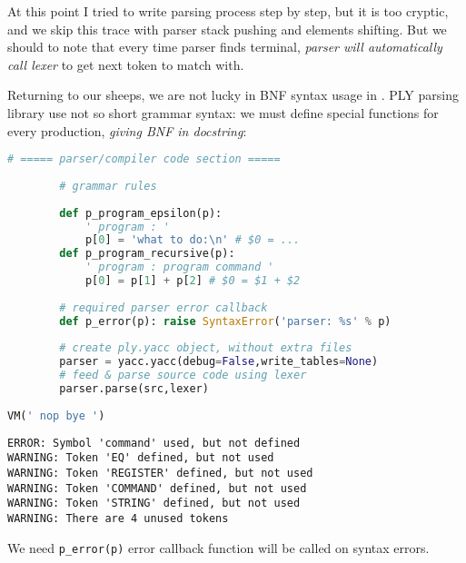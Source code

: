 \bigskip
At this point I tried to write parsing process step by step, but it is too
cryptic, and we skip this trace with parser stack pushing and elements shifting.
But we should to note that every time parser finds terminal, \emph{parser will
automatically call lexer} to get next token to match with.

\clearpage
Returning to our sheeps, we are not lucky in BNF syntax usage in \py.
PLY parsing library use not so short grammar syntax: we must define special
functions for every production, \emph{giving BNF in docstring}:
\begin{lstlisting}[language=python]
		# ===== parser/compiler code section =====
		
		# grammar rules
		
		def p_program_epsilon(p):
			' program : '
			p[0] = 'what to do:\n' # $0 = ...
		def p_program_recursive(p):
			' program : program command '
			p[0] = p[1] + p[2] # $0 = $1 + $2
			
		# required parser error callback
		def p_error(p): raise SyntaxError('parser: %s' % p)
		
		# create ply.yacc object, without extra files
		parser = yacc.yacc(debug=False,write_tables=None)
		# feed & parse source code using lexer
		parser.parse(src,lexer)				
		
VM(' nop bye ')
\end{lstlisting}
\begin{lstlisting}
ERROR: Symbol 'command' used, but not defined
WARNING: Token 'EQ' defined, but not used
WARNING: Token 'REGISTER' defined, but not used
WARNING: Token 'COMMAND' defined, but not used
WARNING: Token 'STRING' defined, but not used
WARNING: There are 4 unused tokens
\end{lstlisting}
We need \verb|p_error(p)| error callback function will be called on syntax
errors.

